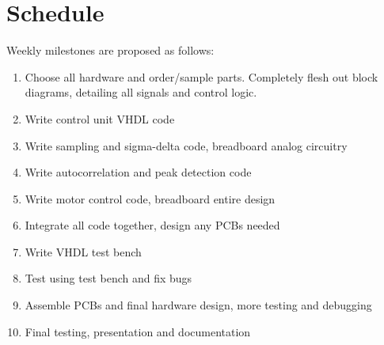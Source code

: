 \documentclass[aps,letterpaper,10pt]{revtex4}
\begin{document}
\section{Schedule}
Weekly milestones are proposed as follows:
\begin{enumerate}
\item Choose all hardware and order/sample parts. Completely flesh out block diagrams, detailing all signals and control logic.
\item Write control unit VHDL code
\item Write sampling and sigma-delta code, breadboard analog circuitry
\item Write autocorrelation and peak detection code
\item Write motor control code, breadboard entire design
\item Integrate all code together, design any PCBs needed
\item Write VHDL test bench
\item Test using test bench and fix bugs
\item Assemble PCBs and final hardware design, more testing and debugging
\item Final testing, presentation and documentation
\end{enumerate}
	





\theendnotes
\end{document}
